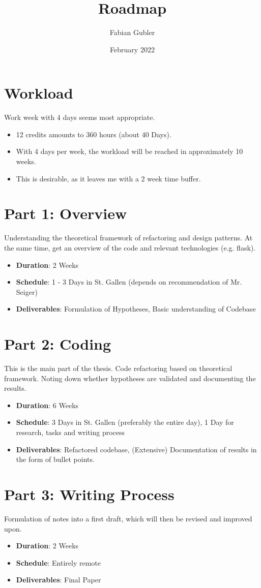 \documentclass[12pt]{article}
\title{Roadmap}
\author{Fabian Gubler}
\date{February 2022}
\begin{document}
\maketitle

\section*{Workload}

Work week with 4 days seems most appropriate.

\begin{itemize}
	\item 12 credits amounts to 360 hours (about 40 Days). 
	\item With 4 days per week, the workload will be reached in approximately 10 weeks. 
	\item This is desirable, as it leaves me with a 2 week time buffer.\par
\end{itemize}

\section*{Part 1: Overview}
Understanding the theoretical framework of refactoring and design patterns. At the same time, get an overview of the code and relevant technologies (e.g. flask).
\begin{itemize}
	\item \textbf{Duration}: 2 Weeks
	\item \textbf{Schedule}: 1 - 3 Days in St. Gallen (depends on recommendation of Mr. Seiger)
	\item \textbf{Deliverables}: Formulation of Hypotheses, Basic understanding of Codebase
\end{itemize}


\section*{Part 2: Coding}
This is the main part of the thesis. Code refactoring based on theoretical framework. Noting down whether hypotheses are validated and documenting the results.
\begin{itemize}
	\item \textbf{Duration}: 6 Weeks
	\item \textbf{Schedule}: 3 Days in St. Gallen (preferably the entire day), 1 Day for research, tasks and writing process
	\item \textbf{Deliverables}: Refactored codebase, (Extensive) Documentation of results in the form of bullet points.
\end{itemize}

\section*{Part 3: Writing Process}
Formulation of notes into a first draft, which will then be revised and improved upon.
\begin{itemize}
	\item \textbf{Duration}: 2 Weeks \
	\item \textbf{Schedule}: Entirely remote\
	\item \textbf{Deliverables}: Final Paper\
\end{itemize}
\end{document}
